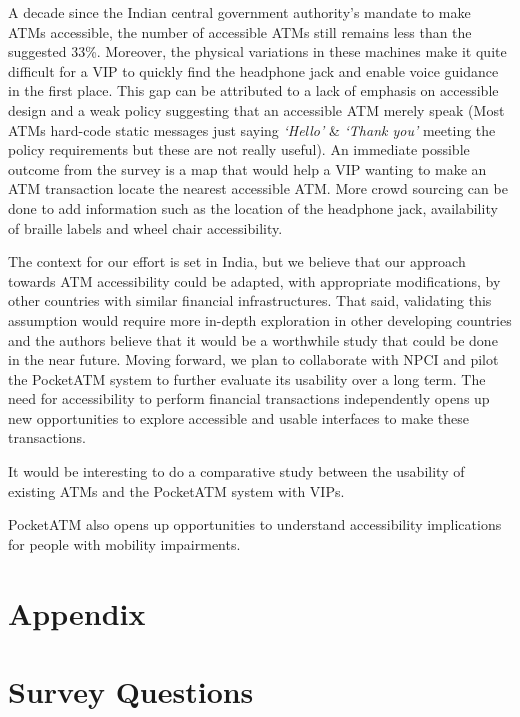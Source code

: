 A decade since the Indian central government authority's mandate to make ATMs accessible, the number of accessible ATMs still remains less than the suggested 33\%. Moreover, the physical variations in these machines make it quite difficult for a VIP to quickly find the headphone jack and enable voice guidance in the first place. This gap can be attributed to a lack of emphasis on accessible design and a weak policy suggesting that an accessible ATM merely speak (Most ATMs hard-code static messages just saying \textit{`Hello'} \& \textit{`Thank you'} meeting the policy requirements but these are not really useful). An immediate possible outcome from the survey is a map that would help a VIP wanting to make an ATM transaction locate the nearest accessible ATM. More crowd sourcing can be done to add information such as the location of the headphone jack, availability of braille labels and wheel chair accessibility. 

The context for our effort is set in India, but we believe that our approach towards ATM accessibility could be adapted, with appropriate modifications, by other countries with similar financial infrastructures. That said, validating this assumption would require more in-depth exploration in other developing countries and the authors believe that it would be a worthwhile study that could be done in the near future. Moving forward, we plan to collaborate with NPCI and pilot the PocketATM system to further evaluate its usability over a long term. The need for accessibility to perform financial transactions independently opens up new opportunities to explore accessible and usable interfaces to make these transactions. 

It would be interesting to do a comparative study between the usability of existing ATMs and the PocketATM system with VIPs. 

PocketATM also opens up opportunities to understand accessibility implications for people with mobility impairments.
 

\section*{Appendix}
\appendix

\section{Survey Questions}
\label{appendix:surveyquestions}

